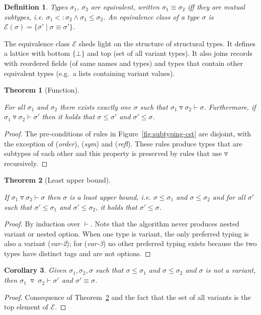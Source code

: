 \documentclass[10pt,preprint,blind,clearpagebib]{sigplanconf}
\newcommand{\tsep}[0]{\; \triangledown \;}
\newtheorem{definition}{Definition}
\newtheorem{theorem}{Theorem}
\newtheorem{corollary}[theorem]{Corollary}
\begin{document}
\begin{definition}
Types $\sigma_1$, $\sigma_2$ are \emph{equivalent}, written $\sigma_1 \equiv \sigma_2$ iff
they are mutual subtypes, i.e. $\sigma_1 <: \sigma_2 \wedge \sigma_1 \leq \sigma_2$.
An equivalence class of a type $\sigma$ is $\mathcal{E}(\sigma) = \{ \sigma' \;|\; \sigma\equiv\sigma' \}$.
\end{definition}

\noindent
The equivalence class $\mathcal{E}$ sheds light on the structure of structural types. It defines
a lattice with bottom $\{ \bot \}$ and top (set of all variant types). It also joins records with
reordered fields (of same names and types) and types that contain other equivalent types (e.g.~a
lists containing variant values).

\begin{theorem}[Function]
\label{thm:func}
\raggedright
For all $\sigma_1$ and $\sigma_2$ there exists exactly one $\sigma$ such that 
$\sigma_1 \triangledown \sigma_2 \vdash \sigma$.
Furthermore, if $\sigma_1 \triangledown \sigma_2 \vdash \sigma'$
then it holds that $\sigma \leq \sigma'$ and $\sigma' \leq \sigma$.
\end{theorem}
\begin{proof}
The pre-conditions of rules in Figure~\ref{fig:subtyping-cst} are disjoint, with the exception 
of (\emph{order}), (\emph{sym}) and (\emph{refl}). These rules produce types that are subtypes
of each other and this property is preserved by rules that use $\triangledown$ recursively.
\end{proof}

\begin{theorem}[Least upper bound]
\label{thm:lub}
\raggedright
If $\sigma_1 \triangledown \sigma_2 \vdash \sigma$ then $\sigma$ is a least upper bound, i.e. 
$\sigma \leq \sigma_1$ and $\sigma \leq \sigma_2$ and for all $\sigma'$ such that $\sigma' \leq \sigma_1$
and $\sigma' \leq \sigma_2$, it holds that $\sigma' \leq \sigma$.
\end{theorem}
\begin{proof}
By induction over $\vdash$. Note that the algorithm never produces nested variant or nested
option. When one type is variant, the only preferred typing is also a variant (\emph{var-2}); 
for (\emph{var-3}) no other preferred typing exists because the two types have distinct 
tags and are not options.
\end{proof}

\begin{corollary}
\label{thm:no-unions}
Given $\sigma_1, \sigma_2, \sigma$ such that $\sigma \leq \sigma_1$ and $\sigma \leq \sigma_2$ and 
$\sigma$ is not a variant, then $\sigma_1 \tsep \sigma_2 \vdash \sigma'$ 
and $\sigma' \equiv \sigma$.
\end{corollary}
\begin{proof}
Consequence of Theorem~\ref{thm:lub} and the fact that the set of all variants is the
top element of $\mathcal{E}$.
\end{proof}
\end{document}
